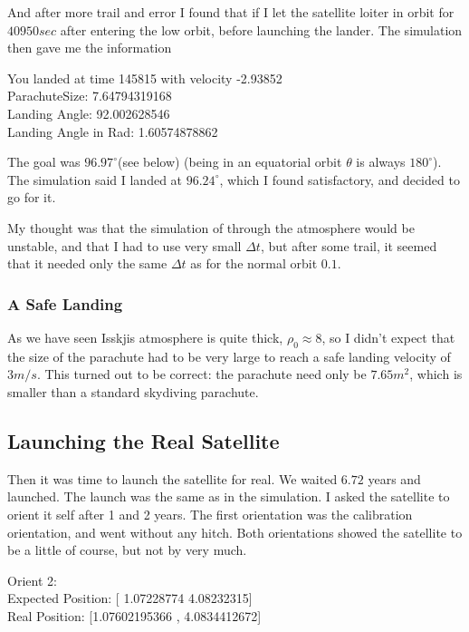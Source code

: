 \documentclass[a4paper, 10pt]{article}
\begin{document}
And after more trail and error I found that if I let the satellite loiter in orbit for $40950 sec$ after entering the low orbit, before launching the lander. The simulation then gave me the information

\begin{tcolorbox}
You landed at time 145815 with velocity -2.93852\\
ParachuteSize:  7.64794319168\\
Landing Angle:  92.002628546\\
Landing Angle in Rad:  1.60574878862
\end{tcolorbox}

The goal was $96.97^\circ$(see below) (being in an equatorial orbit $\theta$ is always $180^\circ$). The simulation said I landed at $96.24^\circ$, which I found satisfactory, and decided to go for it.

My thought was that the simulation of through the atmosphere would be unstable, and that I had to use very small $\Delta t$, but after some trail, it seemed that it needed only the same $\Delta t$ as for the normal orbit $0.1$.

\subsubsection{A Safe Landing}
As we have seen Isskjis atmosphere is quite thick, $\rho_0 \approx 8$, so I didn't expect that the size of the parachute had to be very large to reach a safe landing velocity of $3m/s$. This turned out to be correct: the parachute need only be  $7.65 m^2$, which is smaller than a standard skydiving parachute.


\subsection{Launching the Real Satellite} 
Then it was time to launch the satellite for real. We waited $6.72$ years and launched. The launch was the same as in the simulation. I asked the satellite to orient it self after 1 and 2 years. The first orientation was the calibration orientation, and went without any hitch. Both orientations showed the satellite to be a little of course, but not by very much. 

\begin{tcolorbox}
Orient 2:\\
Expected Position: [ 1.07228774  4.08232315]\\
Real Position: [1.07602195366 , 4.0834412672]
\end{tcolorbox}
\end{document}
